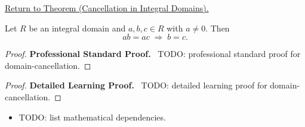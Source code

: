 \newpage
{}
\label{prf:domain-cancellation}

\begin{remark*}[Return]
\hyperref[prop:domain-cancellation]{Return to Theorem (Cancellation in Integral Domains).}
\end{remark*}

\begin{theorem*}
Let $R$ be an integral domain and $a, b, c \in R$ with $a \neq 0$.
Then
\[
ab = ac \;\Longrightarrow\; b = c.
\]
\end{theorem*}

\begin{proof}
\textbf{Professional Standard Proof.}~
TODO: professional standard proof for domain-cancellation.
\end{proof}

\begin{proof}
\textbf{Detailed Learning Proof.}~
TODO: detailed learning proof for domain-cancellation.
\end{proof}

\begin{remark*}
\end{remark*}

\begin{dependencies}
\begin{itemize}
  \item TODO: list mathematical dependencies.
\end{itemize}
\end{dependencies}

\clearpage
